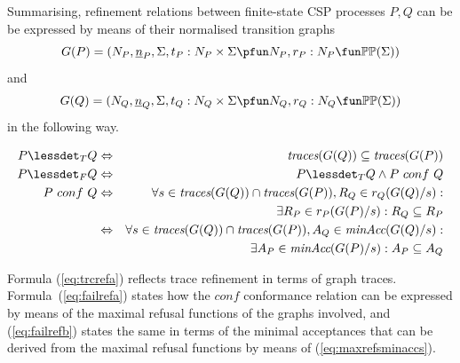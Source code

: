 Summarising, refinement relations between finite-state CSP processes $P, Q$ can be be
expressed by means of their normalised transition graphs 
$$G(P) = ( N_P, {\ii n}_P, \Sigma, t_P : N_P\times\Sigma \pfun N_P, r_P : N_P \fun \mathbb{P}\mathbb{P}(\Sigma))$$ 
and 
$$G(Q) = ( N_Q, {\ii n}_Q, \Sigma, t_Q : N_Q\times\Sigma \pfun N_Q, r_Q : N_Q \fun \mathbb{P}\mathbb{P}(\Sigma))$$
in the following
way. 
\begin{lemma}
  \label{lemma:tgtrcref}
  \begin{eqnarray}
  P \lessdet_T Q & \Leftrightarrow & \trc(G(Q)) \subseteq\trc(G(P))
  \label{eq:trcrefa}
  \\
  \label{eq:failconf}
  P \lessdet_F Q & \Leftrightarrow & P \lessdet_T Q \wedge P\ conf\ Q
  \\
  \label{eq:failrefa}
  P\ conf\ Q & \Leftrightarrow & \nonumber
  \forall s\in\trc(G(Q))\cap \trc(G(P)), R_Q\in r_Q(G(Q)/s):  \nonumber
  \\ & & \tabd
  \exists R_P\in r_P(G(P)/s): R_Q\subseteq R_P
  \\
  \label{eq:failrefb}
   & \Leftrightarrow & 
    \forall s\in\trc(G(Q))\cap \trc(G(P)), A_Q\in\minaccs(G(Q)/s):  \nonumber
   \\ & & \tabd
  \exists A_P\in\minaccs(G(P)/s): A_P\subseteq A_Q
 \end{eqnarray}
  \xbox
\end{lemma}
%

Formula (\ref{eq:trcrefa}) reflects trace refinement in terms of graph traces.  Formula~(\ref{eq:failrefa}) states how the $conf$ conformance relation can be expressed
by means of the maximal refusal functions of the graphs involved, and (\ref{eq:failrefb})
states the same in terms of the minimal acceptances that can be derived from the 
maximal refusal functions by means of (\ref{eq:maxrefsminaccs}). 


